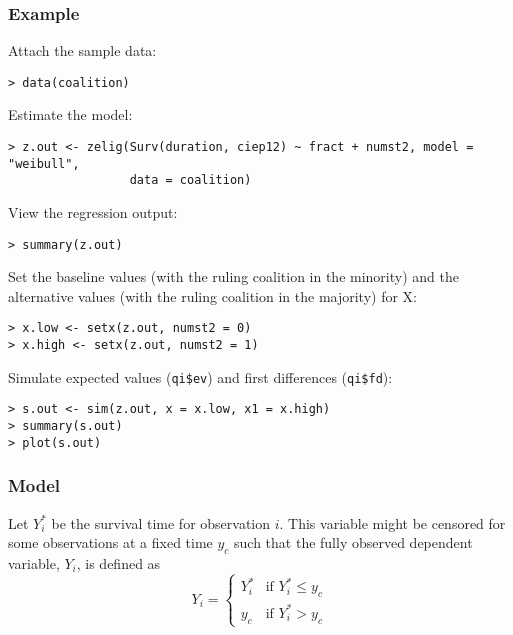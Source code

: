 \subsubsection{Example}

Attach the sample data: 
\begin{verbatim}
> data(coalition)
\end{verbatim}
Estimate the model: 
\begin{verbatim}
> z.out <- zelig(Surv(duration, ciep12) ~ fract + numst2, model = "weibull",
                 data = coalition)
\end{verbatim}
View the regression output:  
\begin{verbatim}
> summary(z.out)
\end{verbatim}
Set the baseline values (with the ruling coalition in the minority)
and the alternative values (with the ruling coalition in the majority)
for X:
\begin{verbatim}
> x.low <- setx(z.out, numst2 = 0)
> x.high <- setx(z.out, numst2 = 1)
\end{verbatim}
Simulate expected values ({\tt qi\$ev}) and first differences ({\tt qi\$fd}):
\begin{verbatim}
> s.out <- sim(z.out, x = x.low, x1 = x.high)
> summary(s.out)
> plot(s.out)
\end{verbatim}

\subsubsection{Model}
Let $Y_i^*$ be the survival time for observation $i$. This variable
might be censored for some observations at a fixed time $y_c$ such
that the fully observed dependent variable, $Y_i$, is defined as
\begin{equation*}
  Y_i = \left\{ \begin{array}{ll}
      Y_i^* & \textrm{if }Y_i^* \leq y_c \\
      y_c & \textrm{if }Y_i^* > y_c 
    \end{array} \right.
\end{equation*}

